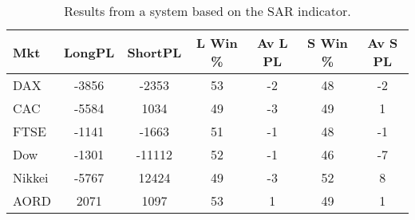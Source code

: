\begin{table}[ht]
\centering
\caption[Results from a system based on the SAR indicator]{Results from a system based on the SAR indicator.} 
\label{tab:sar_results}
\begin{tabular}{lcccccc}
  \toprule Mkt & LongPL & ShortPL & L Win \% & Av L PL & S Win \% & Av S PL \\ 
  \midrule DAX & -3856 & -2353 & 53 & -2 & 48 & -2 \\ 
  CAC & -5584 & 1034 & 49 & -3 & 49 & 1 \\ 
  FTSE & -1141 & -1663 & 51 & -1 & 48 & -1 \\ 
  Dow & -1301 & -11112 & 52 & -1 & 46 & -7 \\ 
  Nikkei & -5767 & 12424 & 49 & -3 & 52 & 8 \\ 
  AORD & 2071 & 1097 & 53 & 1 & 49 & 1 \\ 
   \bottomrule \end{tabular}
\end{table}
